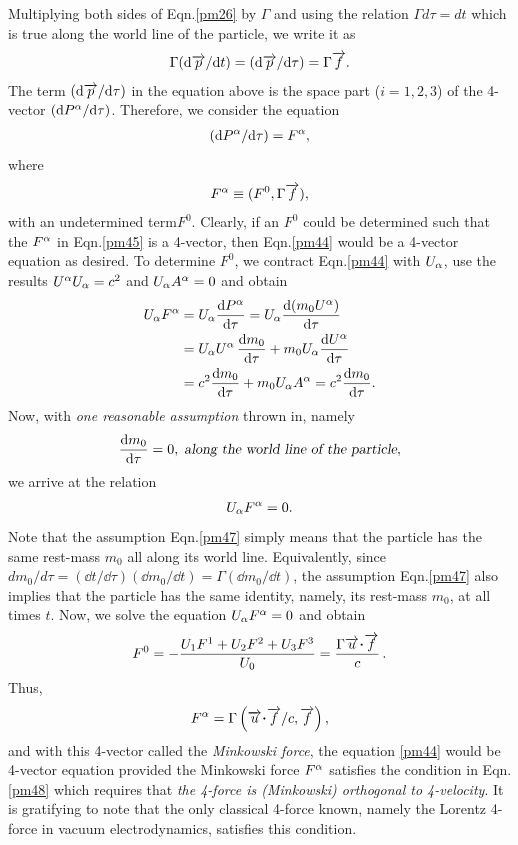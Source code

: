 Multiplying both sides of Eqn.\eqref{pm26} by $\Gamma$ 
and 
using the relation $\Gamma d\tau =dt$ which is true 
along 
the world line of the particle, we write it as
\begin{align}\label{pm43}
\Gamma (\mathrm{d} \overrightarrow{p}/\mathrm{d} t)=(\mathrm{d} \overrightarrow{p}/\mathrm{d} 
\tau)=\Gamma\overrightarrow{f}.
\end{align}
The term $ (\mathrm{d} \overrightarrow{p}/\mathrm{d} \tau) $ in the equation 
above is 
the space part  ($ i=1,2,3 $) of the 4-vector $(\mathrm{d} 
P^{{\alpha}}/\mathrm{d} \tau)$. Therefore, we consider the equation
\begin{align}\label{pm44}
(\mathrm{d} P^{{\alpha}}/\mathrm{d} \tau)=F^{{\alpha}},
\end{align}
where
\begin{align}\label{pm45}
F^{{\alpha}} \equiv (F^0, \Gamma \overrightarrow{f}),
\end{align}
with an {undetermined term}$ F^0 $. Clearly, if an 
$F^0$ 
could be determined such that  the $F^{{\alpha}}$ in 
Eqn.\eqref{pm45} is a 4-vector, then Eqn.\eqref{pm44} 
would 
be a 4-vector equation as desired. To determine $ F^0 
$, we 
contract Eqn.\eqref{pm44} with $U_ {{\alpha}}$, use the 
results 
$U^{{\alpha}} U_ {{\alpha}} =c^2$ and $U_ {{\alpha}} A^{{\alpha}} =0$ and 
obtain
\begin{align}\label{pm46}
U_ {{\alpha}} F^{{\alpha}}&=U_ {{\alpha}} \frac{\mathrm{d}{P^{{\alpha}}}}{\mathrm{d}{\tau}}
=U_ {{\alpha}} \frac{\mathrm{d}{(m_0U^{{\alpha}})}}{\mathrm{d}{\tau}}\notag \\\notag 
&=U_ {{\alpha}} U^{{\alpha}}\,\frac{\mathrm{d}{m_0}}{\mathrm{d}{\tau}} +m_0
U_ {{\alpha}} \frac{\mathrm{d}{U^{{\alpha}}}}{\mathrm{d}{\tau}} \notag\\ 
&=c^2\frac{\mathrm{d}{m_0}}{\mathrm{d}{\tau}}+m_0 U_ {{\alpha}} A^{{\alpha}}
=c^2\frac{\mathrm{d}{m_0}}{\mathrm{d}{\tau}}.
\end{align}
Now, with \textsl{one reasonable assumption} thrown 
in, 
namely
\begin{align}\label{pm47}
\frac{\mathrm{d}{m_0}}{\mathrm{d}{\tau}}=0,\; \textsl{along the world line of the
particle},
\end{align}
we arrive at the relation
\begin{align}\label{pm48}
U_ {{\alpha}} F^{{\alpha}}=0.
\end{align}
Note that the assumption Eqn.\eqref{pm47} simply means 
that 
the particle has the same rest-mass $m_0$ all along 
its 
world line. Equivalently, since  $dm_0/d\tau = (\dd 
t/\dd 
\tau)(\dd m_0/\dd t)=\Gamma(\dd m_0/\dd t)$, the 
assumption 
Eqn.\eqref{pm47} also implies that {the particle has 
the 
same {identity}}, namely, its {rest-mass} $m_0$, at 
all 
times $t$. Now, we solve the equation  $U_ {{\alpha}} 
F^{{\alpha}}=0$ 
and obtain
\begin{align}\label{pm49}
F^0 =-\frac{U_1 F^1 +U_2 F^2 +U_3 F^3}{U_0 }
=\frac{\Gamma \veca{u}\dotp\veca{f}}{c}\,.
\end{align}
Thus,
\begin{align}\label{pm50}
F^\gka= \Gamma\left(\veca{u}\dotp\veca{f}/c, \veca{f} 
\right),
\end{align}
and with this 4-vector called the \textsl{Minkowski 
force}, 
the equation \eqref{pm44} would be 4-vector equation 
provided the Minkowski force $F^{{\alpha}}$ satisfies the 
condition in Eqn.\eqref{pm48} which requires that 
\textsl{the 4-force is (Minkowski) orthogonal to 
4-velocity}. It is gratifying to note that the only 
classical 4-force known, namely the Lorentz 4-force in 
vacuum electrodynamics, satisfies this condition.

